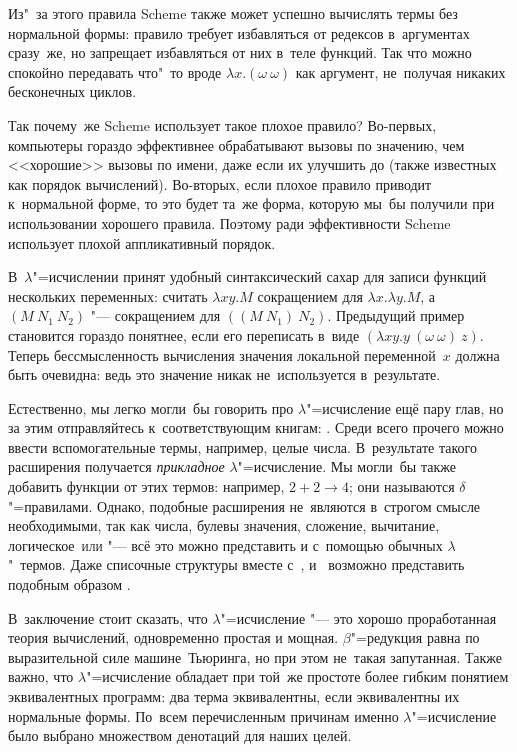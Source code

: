 Из"~за этого правила Scheme также может успешно вычислять термы без нормальной
формы: правило требует избавляться от редексов в~аргументах сразу~же, но
запрещает избавляться от них в~теле функций. Так что можно спокойно передавать
что"~то вроде $\lambda x . (\omega\ \omega)$ как аргумент, не~получая никаких
бесконечных циклов.

Так почему~же Scheme использует такое плохое правило? Во-первых, компьютеры
гораздо эффективнее обрабатывают вызовы по значению, чем <<хорошие>> вызовы по
имени, даже если их улучшить до  (также известных
как  порядок вычислений). Во-вторых, если плохое правило приводит
к~нормальной форме, то это будет та~же форма, которую мы~бы получили при
использовании хорошего правила. Поэтому ради эффективности Scheme использует
плохой аппликативный порядок.

В~$\lambda$"=исчислении принят удобный синтаксический сахар для записи функций
нескольких переменных: считать $\lambda xy . M$ сокращением для $\lambda x .
\lambda y . M$, а $(M\ N_1\ N_2)$ "--- сокращением для $((M\ N_1)\ N_2)$.
Предыдущий пример становится гораздо понятнее, если его переписать в~виде
$(\lambda x y . y\ (\omega\ \omega)\ z)$. Теперь бессмысленность вычисления
значения локальной переменной~$x$ должна быть очевидна: ведь это значение никак
не~используется в~результате.

Естественно, мы легко могли~бы говорить про $\lambda$"=исчисление ещё пару глав,
но за этим отправляйтесь к~соответствующим книгам: \cite{bar84,gor88,dil88}.
Среди всего прочего можно ввести вспомогательные термы, например, целые числа.
В~результате такого расширения получается \emph{прикладное}
$\lambda$"=исчисление. Мы могли~бы также добавить функции от этих термов:
например, $2 + 2 \to 4$; они называются $\delta$"=правилами. Однако, подобные
расширения не~являются в~строгом смысле необходимыми, так как числа, булевы
значения, сложение, вычитание, логическое~\textsc{или} "--- всё это можно
представить и с~помощью обычных $\lambda$"~термов. Даже списочные структуры
вместе с~,  и~ возможно представить подобным образом
\cite{gor88}. 

В~заключение стоит сказать, что $\lambda$"=исчисление "--- это хорошо
проработанная теория вычислений, одновременно простая и мощная.
$\beta$"=редукция равна по выразительной силе машине~Тьюринга, но при этом
не~такая запутанная. Также важно, что $\lambda$"=исчисление обладает при той~же
простоте более гибким понятием эквивалентных программ: два терма эквивалентны,
если эквивалентны их нормальные формы. По~всем перечисленным причинам именно
$\lambda$"=исчисление было выбрано множеством денотаций для наших целей.


